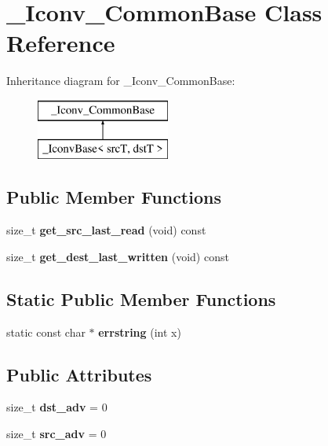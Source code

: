 \hypertarget{class__Iconv__CommonBase}{\section{\-\_\-\-Iconv\-\_\-\-Common\-Base Class Reference}
\label{class__Iconv__CommonBase}
}
Inheritance diagram for \-\_\-\-Iconv\-\_\-\-Common\-Base\-:\begin{figure}[H]
\begin{center}
\leavevmode
\includegraphics[height=2.000000cm]{class__Iconv__CommonBase}
\end{center}
\end{figure}
\subsection*{Public Member Functions}
\begin{DoxyCompactItemize}
\item 
\hypertarget{class__Iconv__CommonBase_a2b6552340dacdac4931258c0619fbad7}{size\-\_\-t {\bfseries get\-\_\-src\-\_\-last\-\_\-read} (void) const }\label{class__Iconv__CommonBase_a2b6552340dacdac4931258c0619fbad7}

\item 
\hypertarget{class__Iconv__CommonBase_a1d27d7277cdd8e141be41d9736259b3e}{size\-\_\-t {\bfseries get\-\_\-dest\-\_\-last\-\_\-written} (void) const }\label{class__Iconv__CommonBase_a1d27d7277cdd8e141be41d9736259b3e}

\end{DoxyCompactItemize}
\subsection*{Static Public Member Functions}
\begin{DoxyCompactItemize}
\item 
\hypertarget{class__Iconv__CommonBase_a23c056db5ca345b36c6b3009ad42c2bd}{static const char $\ast$ {\bfseries errstring} (int x)}\label{class__Iconv__CommonBase_a23c056db5ca345b36c6b3009ad42c2bd}

\end{DoxyCompactItemize}
\subsection*{Public Attributes}
\begin{DoxyCompactItemize}
\item 
\hypertarget{class__Iconv__CommonBase_a3a66ec3098bcffce87630aa12779ca4b}{size\-\_\-t {\bfseries dst\-\_\-adv} = 0}\label{class__Iconv__CommonBase_a3a66ec3098bcffce87630aa12779ca4b}

\item 
\hypertarget{class__Iconv__CommonBase_a509e7fa90fd90ea5aeb5da85c17ed470}{size\-\_\-t {\bfseries src\-\_\-adv} = 0}\label{class__Iconv__CommonBase_a509e7fa90fd90ea5aeb5da85c17ed470}

\end{DoxyCompactItemize}

